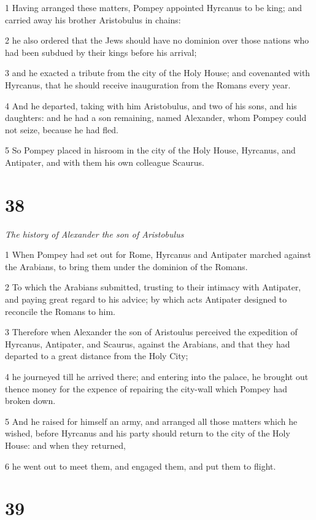 1 Having arranged these matters, Pompey appointed Hyrcanus to be king; and carried away his brother Aristobulus in chains:

2 he also ordered that the Jews should have no dominion over those nations who had been subdued by their kings before his arrival; 

3 and he exacted a tribute from the city of the Holy House; and covenanted with Hyrcanus, that he should receive inauguration from the Romans every year. 

4 And he departed, taking with him Aristobulus, and two of his sons, and his daughters: and he had a son remaining, named Alexander, whom Pompey could not seize, because he had fled. 

5 So Pompey placed in hisroom in the city of the Holy House, Hyrcanus, and Antipater, and with them his own colleague Scaurus.

\chapter{38}

\par \textit{The history of Alexander the son of Aristobulus}

1 When Pompey had set out for Rome, Hyrcanus and Antipater marched against the Arabians, to bring them under the dominion of the Romans. 

2 To which the Arabians submitted, trusting to their intimacy with Antipater, and paying great regard to his advice; by which acts Antipater designed to reconcile the Romans to him. 

3 Therefore when Alexander the son of Aristoulus perceived the expedition of Hyrcanus, Antipater, and Scaurus, against the Arabians, and that they had departed to a great distance from the Holy City; 

4 he journeyed till he arrived there; and entering into the palace, he brought out thence money for the expence of repairing the city-wall which Pompey had broken down. 

5 And he raised for himself an army, and arranged all those matters which he wished, before Hyrcanus and his party should return to the city of the Holy House: and when they returned, 

6 he went out to meet them, and engaged them, and put them to flight. 


\chapter{39}

